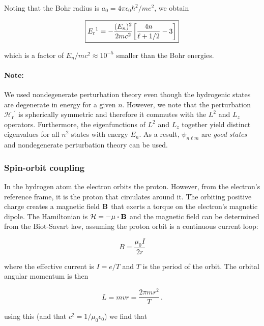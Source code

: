 \documentclass[12pt, titlepage]{article}
\begin{document}
Noting that the Bohr radius is $a_0 = 4\pi\epsilon_0\hbar^2/me^2$, we obtain

\begin{equation}
	\boxed{{E_{\text{r}}}^{1} = -\frac{(E_n)^2}{2mc^2}\qty[\frac{4n}{\ell+1/2}-3]}
\end{equation}

which is a factor of $E_n/mc^2\approx10^{-5}$ smaller than the Bohr energies.

\begin{mdframed}
	\paragraph*{Note:} 
	We used nondegenerate perturbation theory even though the hydrogenic states are degenerate in energy for a given $n$. However, we note that the perturbation ${\mathcal{H}_\text{r}}^\prime$ is spherically symmetric and therefore it commutes with the $L^2$ and $L_z$ operators. Furthermore, the eigenfunctions of $L^2$ and $L_z$ together yield distinct eigenvalues for all $n^2$ states with energy $E_n$. As a result, $\psi_{n\ell m}$ are \textit{good states} and nondegenerate perturbation theory can be used.
\end{mdframed}

\subsubsection{Spin-orbit coupling}
In the hydrogen atom the electron orbits the proton. However, from the electron's reference frame, it is the proton that circulates around it. The orbiting positive charge creates a magnetic field $\vb{B}$ that exerts a torque on the electron's magnetic dipole. The Hamiltonian is $\mathcal{H} = -\vb{\mu}\vdot\vb{B}$ and the magnetic field can be determined from the Biot-Savart law, assuming the proton orbit is a continuous current loop:

\begin{equation}
	B = \frac{\mu_0 I}{2r}
\end{equation}

where the effective current is $I = e/T$ and $T$ is the period of the orbit. The orbital angular momentum is then

\begin{equation}
	L = mvr = \frac{2\pi m r^2}{T} \,.
\end{equation}

using this (and that $c^2 = 1/\mu_0\epsilon_0$) we find that 
\end{document}
